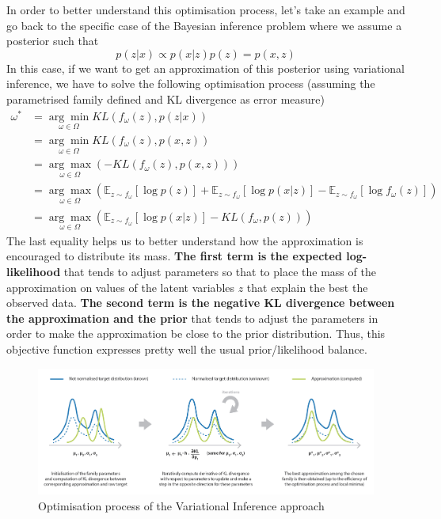In order to better understand this optimisation process, let's take an example and go back to the specific case of the Bayesian inference problem where we assume a posterior such that
\begin{equation}p(z | x) \propto p(x | z) p(z)=p(x, z)\end{equation}
In this case, if we want to get an approximation of this posterior using variational inference, we have to solve the following optimisation process (assuming the parametrised family defined and KL divergence as error measure)
\begin{equation}\begin{aligned}
\omega^{*} &=\underset{\omega \in \Omega}{\arg \min } K L\left(f_{\omega}(z), p(z | x)\right) \\
&=\underset{\omega \in \Omega}{\arg \min } K L\left(f_{\omega}(z), p(x, z)\right) \\
&=\underset{\omega \in \Omega}{\arg \max }\left(-K L\left(f_{\omega}(z), p(x, z)\right)\right) \\
&=\underset{\omega \in \Omega}{\arg \max }\left(\mathbb{E}_{z \sim f_{\omega}}[\log p(z)]+\mathbb{E}_{z \sim f_{\omega}}[\log p(x | z)]-\mathbb{E}_{z \sim f_{\omega}}\left[\log f_{\omega}(z)\right]\right) \\
&=\underset{\omega \in \Omega}{\arg \max }\left(\mathbb{E}_{z \sim f_{\omega}}[\log p(x | z)]-K L\left(f_{\omega}, p(z)\right)\right)
\end{aligned}\end{equation}
The last equality helps us to better understand how the approximation is encouraged to distribute its mass. \textbf{The first term is the expected log-likelihood} that tends to adjust parameters so that to place the mass of the approximation on values of the latent variables $z$ that explain the best the observed data. \textbf{The second term is the negative KL divergence between the approximation and the prior} that tends to adjust the parameters in order to make the approximation be close to the prior distribution. Thus, this objective function expresses pretty well the usual prior/likelihood balance.

\begin{figure}[h]
    \centering
\includegraphics[width=\textwidth]{pic/p05c07-snip08.png}
    \caption{Optimisation process of the Variational Inference approach}
    \label{fig:p05c07-snip08}
\end{figure}


